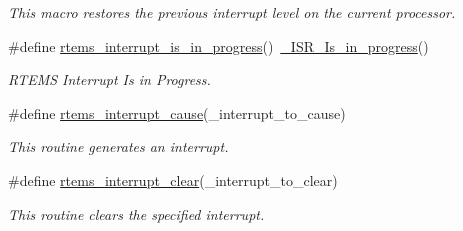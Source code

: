 \begin{DoxyCompactItemize}
\begin{DoxyCompactList}\small\item\em This macro restores the previous interrupt level on the current processor. \end{DoxyCompactList}\item 
\#define \mbox{\hyperlink{group__ClassicINTR_ga8e688f778a82fbde79a5f57412200b6e}{rtems\+\_\+interrupt\+\_\+is\+\_\+in\+\_\+progress}}()~\mbox{\hyperlink{group__RTEMSScoreISR_ga3b125bb9faac2fa94bd0ba0583cf5f77}{\+\_\+\+I\+S\+R\+\_\+\+Is\+\_\+in\+\_\+progress}}()
\begin{DoxyCompactList}\small\item\em R\+T\+E\+MS Interrupt Is in Progress. \end{DoxyCompactList}\item 
\#define \mbox{\hyperlink{group__ClassicINTR_gab8bfce3dc5dcc32b753742c3c14ac8df}{rtems\+\_\+interrupt\+\_\+cause}}(\+\_\+interrupt\+\_\+to\+\_\+cause)
\begin{DoxyCompactList}\small\item\em This routine generates an interrupt. \end{DoxyCompactList}\item 
\#define \mbox{\hyperlink{group__ClassicINTR_ga51ee1b4b829b95f9bddf5800ff0982d4}{rtems\+\_\+interrupt\+\_\+clear}}(\+\_\+interrupt\+\_\+to\+\_\+clear)
\begin{DoxyCompactList}\small\item\em This routine clears the specified interrupt. \end{DoxyCompactList}\end{DoxyCompactItemize}
